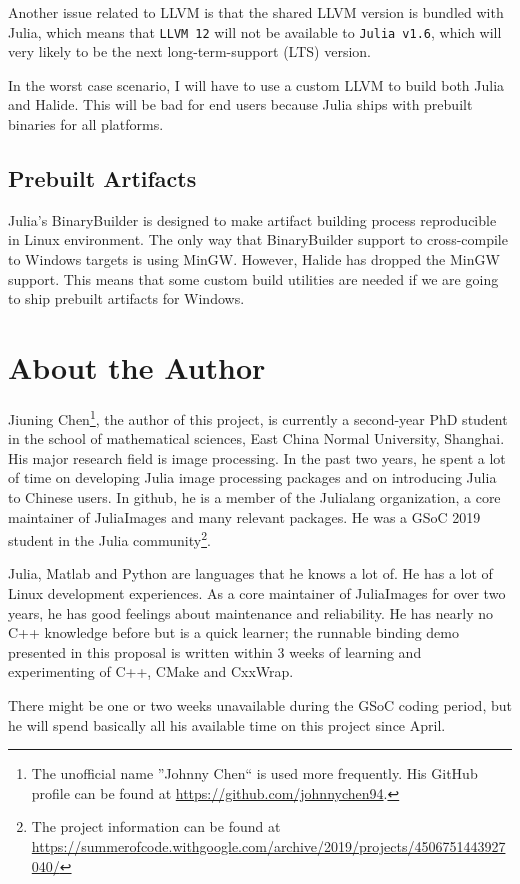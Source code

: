 \documentclass{article}
\begin{document}
Another issue related to LLVM is that the shared LLVM version is bundled with Julia, which means that \lstinline{LLVM 12} will not be available to \lstinline{Julia v1.6}, which will very likely to be the next long-term-support (LTS) version.

In the worst case scenario, I will have to use a custom LLVM to build both Julia and Halide. This will be bad for end users because Julia ships with prebuilt binaries for all platforms.

\subsection{Prebuilt Artifacts}

Julia's BinaryBuilder is designed to make artifact building process reproducible in Linux environment. The only way that BinaryBuilder support to cross-compile to Windows targets is using MinGW. However, Halide has dropped the MinGW support. This means that some custom build utilities are needed if we are going to ship prebuilt artifacts for Windows.


\section{About the Author}

Jiuning Chen\footnote{The unofficial name ''Johnny Chen`` is used more frequently. His GitHub profile can be found at \url{https://github.com/johnnychen94}.}, the author of this project, is currently a second-year PhD student in the school of mathematical sciences, East China Normal University, Shanghai. His major research field is image processing. In the past two years, he spent a lot of time on developing Julia image processing packages and on introducing Julia to Chinese users. In github, he is a member of the Julialang organization, a core maintainer of JuliaImages and many relevant packages. He was a GSoC 2019 student in the Julia community\footnote{The project information can be found at \url{https://summerofcode.withgoogle.com/archive/2019/projects/4506751443927040/}}.

Julia, Matlab and Python are languages that he knows a lot of. He has a lot of Linux development experiences. As a core maintainer of JuliaImages for over two years, he has good feelings about maintenance and reliability. He has nearly no C++ knowledge before but is a quick learner; the runnable binding demo presented in this proposal is written within 3 weeks of learning and experimenting of C++, CMake and CxxWrap.

There might be one or two weeks unavailable during the GSoC coding period, but he will spend basically all his available time on this project since April.



\end{document}
